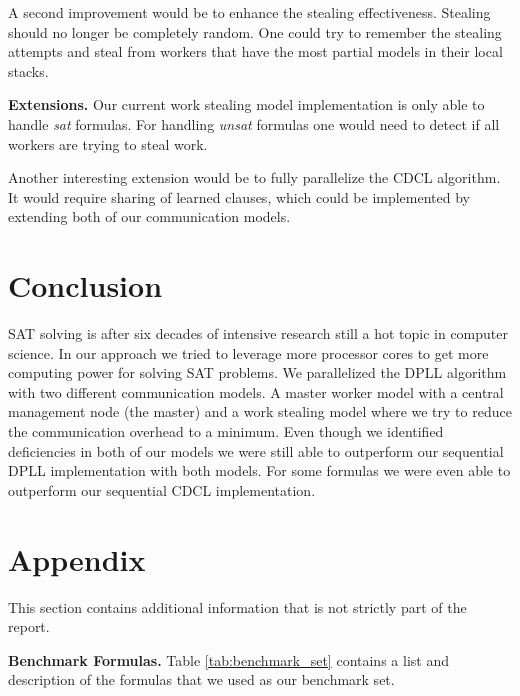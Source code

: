 \documentclass[letterpaper]{article}
\newcommand{\mypar}[1]{{\bf #1.}}
\begin{document}
A second improvement would be to enhance the stealing effectiveness.
Stealing should no longer be completely random.
One could try to remember the stealing attempts and steal from workers that have the most partial models in their local stacks.

\mypar{Extensions}
Our current work stealing model implementation is only able to handle \textit{sat} formulas.
For handling \textit{unsat} formulas one would need to detect if all workers are trying to steal work.

Another interesting extension would be to fully parallelize the CDCL algorithm.
It would require sharing of learned clauses, which could be implemented by extending both of our communication models.

\section{Conclusion}\label{sec:conclusion}
SAT solving is after six decades of intensive research still a hot topic in computer science.
In our approach we tried to leverage more processor cores to get more computing power for solving SAT problems.
We parallelized the DPLL algorithm with two different communication models.
A master worker model with a central management node (the master) and a work stealing model where we try to reduce the communication overhead to a minimum.
Even though we identified deficiencies in both of our models we were still able to outperform our sequential DPLL implementation with both models.
For some formulas we were even able to outperform our sequential CDCL implementation.




\newpage
\section{Appendix}
This section contains additional information that is not strictly part of the report.

\mypar{Benchmark Formulas}
Table \ref{tab:benchmark_set} contains a list and description of the formulas that we used as our benchmark set.
\end{document}
